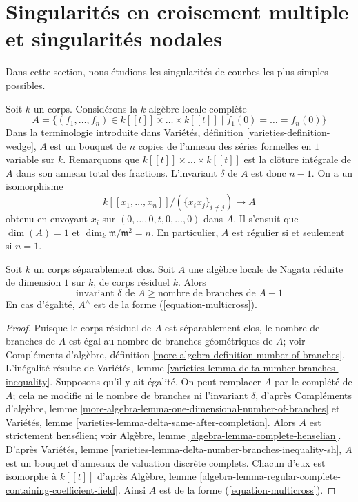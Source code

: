 \section{Singularités en croisement multiple et singularités nodales}
\label{section-multicross}

\noindent
Dans cette section, nous étudions les singularités de courbes les plus simples possibles.

\medskip\noindent
Soit $k$ un corps. Considérons la $k$-algèbre locale complète \begin{equation}
\label{equation-multicross}
A = \{(f_1, \ldots, f_n) \in k[[t]] \times \ldots \times k[[t]] \mid
f_1(0) = \ldots = f_n(0)\}
\end{equation} Dans la terminologie introduite dans Variétés, définition \ref{varieties-definition-wedge}, $A$ est un bouquet de $n$ copies de l'anneau des séries formelles en $1$ variable sur $k$. Remarquons que $k[[t]] \times \ldots \times k[[t]]$ est la clôture intégrale de $A$ dans son anneau total des fractions. L'invariant $\delta$ de $A$ est donc $n - 1$. On a un isomorphisme $$
k[[x_1, \ldots, x_n]]/(\{x_ix_j\}_{i \not = j}) \longrightarrow A
$$ obtenu en envoyant $x_i$ sur $(0, \ldots, 0, t, 0, \ldots, 0)$ dans $A$. Il s'ensuit que $\dim(A) = 1$ et $\dim_k \mathfrak m/\mathfrak m^2 = n$. En particulier, $A$ est régulier si et seulement si $n = 1$.

\begin{lemma}
\label{lemma-multicross-algebra}
Soit $k$ un corps séparablement clos. Soit $A$ une algèbre locale de Nagata réduite de dimension $1$ sur $k$, de corps résiduel $k$. Alors $$
\text{invariant }\delta\text{ de }A \geq \text{nombre de branches de }A - 1
$$ En cas d'égalité, $A^\wedge$ est de la forme (\ref{equation-multicross}).
\end{lemma}

\begin{proof}
Puisque le corps résiduel de $A$ est séparablement clos, le nombre de branches de $A$ est égal au nombre de branches géométriques de $A$; voir Compléments d'algèbre, définition \ref{more-algebra-definition-number-of-branches}. L'inégalité résulte de Variétés, lemme \ref{varieties-lemma-delta-number-branches-inequality}. Supposons qu'il y ait égalité. On peut remplacer $A$ par le complété de $A$; cela ne modifie ni le nombre de branches ni l'invariant $\delta$, d'après Compléments d'algèbre, lemme \ref{more-algebra-lemma-one-dimensional-number-of-branches} et Variétés, lemme \ref{varieties-lemma-delta-same-after-completion}. Alors $A$ est strictement hensélien; voir Algèbre, lemme \ref{algebra-lemma-complete-henselian}. D'après Variétés, lemme \ref{varieties-lemma-delta-number-branches-inequality-sh}, $A$ est un bouquet d'anneaux de valuation discrète complets. Chacun d'eux est isomorphe à $k[[t]]$ d'après Algèbre, lemme \ref{algebra-lemma-regular-complete-containing-coefficient-field}. Ainsi $A$ est de la forme (\ref{equation-multicross}).
\end{proof}

